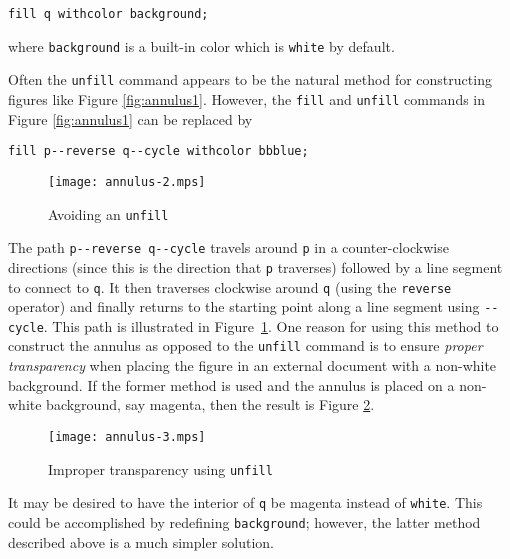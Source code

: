 \begin{center}
  \verb|fill q withcolor background;|
\end{center}

where \texttt{background} is a built-in color which is \texttt{white} by
default.

Often the \texttt{unfill} command appears to be the natural method for
constructing figures like Figure \ref{fig:annulus1}.  However, the
\texttt{fill} and \texttt{unfill} commands in Figure \ref{fig:annulus1}
can be replaced by

\begin{center}
  \verb|fill p--reverse q--cycle withcolor bbblue;|
\end{center}

\begin{figure}
  \centering
  \texttt{[image: annulus-2.mps]}
  \caption{Avoiding an \texttt{unfill}}
  \label{fig:annulus2}
\end{figure}

The path \verb|p--reverse q--cycle| travels around \texttt{p} in a
counter-clockwise directions (since this is the direction that
\texttt{p} traverses) followed by a line segment to connect to
\texttt{q}.  It then traverses clockwise around \texttt{q} (using the
\texttt{reverse} operator) and finally returns to the starting point
along a line segment using \texttt{-{}-cycle}.  This path is illustrated
in Figure~\ref{fig:annulus2}.  One reason for using this method to
construct the annulus as opposed to the \texttt{unfill} command is to
ensure \textit{proper transparency} when placing the figure in an
external document with a non-white background.  If the former method is
used and the annulus is placed on a non-white background, say magenta,
then the result is Figure \ref{fig:annulus3}.

\begin{figure}
  \centering
  \texttt{[image: annulus-3.mps]}
  \caption{Improper transparency using \texttt{unfill}}
  \label{fig:annulus3}
\end{figure}

It may be desired to have the interior of \texttt{q} be magenta instead
of \texttt{white}.  This could be accomplished by redefining
\texttt{background}; however, the latter method described above is a
much simpler solution.
